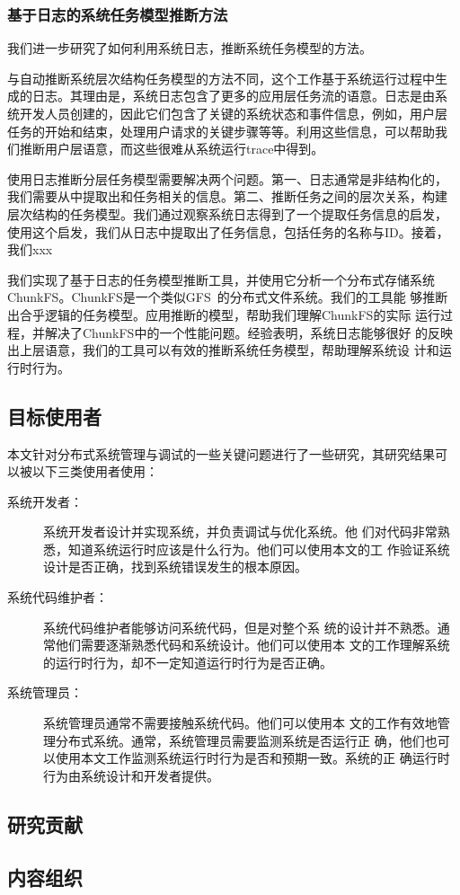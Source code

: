\subsubsection*{基于日志的系统任务模型推断方法}

我们进一步研究了如何利用系统日志，推断系统任务模型的方法。

与自动推断系统层次结构任务模型的方法不同，这个工作基于系统运行过程中生
成的日志。其理由是，系统日志包含了更多的应用层任务流的语意。日志是由系
统开发人员创建的，因此它们包含了关键的系统状态和事件信息，例如，用户层
任务的开始和结束，处理用户请求的关键步骤等等。利用这些信息，可以帮助我
们推断用户层语意，而这些很难从系统运行trace中得到。

使用日志推断分层任务模型需要解决两个问题。第一、日志通常是非结构化的，
我们需要从中提取出和任务相关的信息。第二、推断任务之间的层次关系，构建
层次结构的任务模型。我们通过观察系统日志得到了一个提取任务信息的启发，
使用这个启发，我们从日志中提取出了任务信息，包括任务的名称与ID。接着，
我们xxx

我们实现了基于日志的任务模型推断工具，并使用它分析一个分布式存储系统
ChunkFS。ChunkFS是一个类似GFS~\cite{gfs}的分布式文件系统。我们的工具能
够推断出合乎逻辑的任务模型。应用推断的模型，帮助我们理解ChunkFS的实际
运行过程，并解决了ChunkFS中的一个性能问题。经验表明，系统日志能够很好
的反映出上层语意，我们的工具可以有效的推断系统任务模型，帮助理解系统设
计和运行时行为。


\subsection{目标使用者}

本文针对分布式系统管理与调试的一些关键问题进行了一些研究，其研究结果可
以被以下三类使用者使用：

\begin{description}

  \item[系统开发者：] 系统开发者设计并实现系统，并负责调试与优化系统。他
  们对代码非常熟悉，知道系统运行时应该是什么行为。他们可以使用本文的工
  作验证系统设计是否正确，找到系统错误发生的根本原因。

  \item[系统代码维护者：] 系统代码维护者能够访问系统代码，但是对整个系
  统的设计并不熟悉。通常他们需要逐渐熟悉代码和系统设计。他们可以使用本
  文的工作理解系统的运行时行为，却不一定知道运行时行为是否正确。

  \item[系统管理员：] 系统管理员通常不需要接触系统代码。他们可以使用本
  文的工作有效地管理分布式系统。通常，系统管理员需要监测系统是否运行正
  确，他们也可以使用本文工作监测系统运行时行为是否和预期一致。系统的正
  确运行时行为由系统设计和开发者提供。

\end{description}

\subsection{研究贡献}

\subsection{内容组织}


